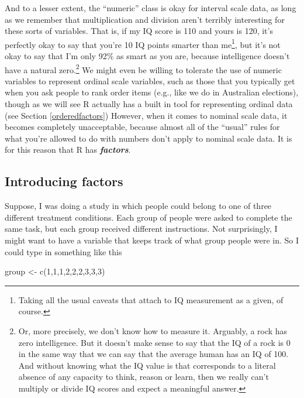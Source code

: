 \documentclass[
]{book}
\newenvironment{Shaded}{\begin{snugshade}}{\end{snugshade}}
\newcommand{\DecValTok}[1]{\textcolor[rgb]{0.00,0.00,0.81}{#1}}
\newcommand{\FunctionTok}[1]{\textcolor[rgb]{0.00,0.00,0.00}{#1}}
\newcommand{\NormalTok}[1]{#1}
\newcommand{\OtherTok}[1]{\textcolor[rgb]{0.56,0.35,0.01}{#1}}
\begin{document}
And to a lesser extent, the ``numeric'' class is okay for interval scale data, as long as we remember that multiplication and division aren't terribly interesting for these sorts of variables. That is, if my IQ score is 110 and yours is 120, it's perfectly okay to say that you're 10 IQ points smarter than me\footnote{Taking all the usual caveats that attach to IQ measurement as a given, of course.}, but it's not okay to say that I'm only 92\% as smart as you are, because intelligence doesn't have a natural zero.\footnote{Or, more precisely, we don't know how to measure it. Arguably, a rock has zero intelligence. But it doesn't make sense to say that the IQ of a rock is 0 in the same way that we can say that the average human has an IQ of 100. And without knowing what the IQ value is that corresponds to a literal absence of any capacity to think, reason or learn, then we really can't multiply or divide IQ scores and expect a meaningful answer.} We might even be willing to tolerate the use of numeric variables to represent ordinal scale variables, such as those that you typically get when you ask people to rank order items (e.g., like we do in Australian elections), though as we will see R actually has a built in tool for representing ordinal data (see Section \ref{orderedfactors}) However, when it comes to nominal scale data, it becomes completely unacceptable, because almost all of the ``usual'' rules for what you're allowed to do with numbers don't apply to nominal scale data. It is for this reason that R has \textbf{\emph{factors}}.

\hypertarget{introducing-factors}{%
\subsection{Introducing factors}\label{introducing-factors}}

Suppose, I was doing a study in which people could belong to one of three different treatment conditions. Each group of people were asked to complete the same task, but each group received different instructions. Not surprisingly, I might want to have a variable that keeps track of what group people were in. So I could type in something like this

\begin{Shaded}
\begin{Highlighting}[]
\NormalTok{group }\OtherTok{\textless{}{-}} \FunctionTok{c}\NormalTok{(}\DecValTok{1}\NormalTok{,}\DecValTok{1}\NormalTok{,}\DecValTok{1}\NormalTok{,}\DecValTok{2}\NormalTok{,}\DecValTok{2}\NormalTok{,}\DecValTok{2}\NormalTok{,}\DecValTok{3}\NormalTok{,}\DecValTok{3}\NormalTok{,}\DecValTok{3}\NormalTok{)}
\end{Highlighting}
\end{Shaded}
\end{document}
